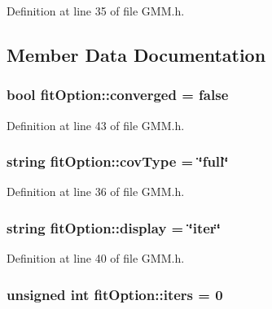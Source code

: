 Definition at line 35 of file G\+M\+M.\+h.



\subsection{Member Data Documentation}
\hypertarget{structfit_option_a600d82e88e845abb5a442f80eecf89cb}{
\subsubsection[{converged}]{\setlength{\rightskip}{0pt plus 5cm}bool fit\+Option\+::converged = false}}\label{structfit_option_a600d82e88e845abb5a442f80eecf89cb}


Definition at line 43 of file G\+M\+M.\+h.

\hypertarget{structfit_option_ae1d880f6fcd26e15f07d50c77c5cceea}{
\subsubsection[{cov\+Type}]{\setlength{\rightskip}{0pt plus 5cm}string fit\+Option\+::cov\+Type = \char`\"{}full\char`\"{}}}\label{structfit_option_ae1d880f6fcd26e15f07d50c77c5cceea}


Definition at line 36 of file G\+M\+M.\+h.

\hypertarget{structfit_option_acd949efbbb51ddf447d4cb86fd2ac901}{
\subsubsection[{display}]{\setlength{\rightskip}{0pt plus 5cm}string fit\+Option\+::display = \char`\"{}iter\char`\"{}}}\label{structfit_option_acd949efbbb51ddf447d4cb86fd2ac901}


Definition at line 40 of file G\+M\+M.\+h.

\hypertarget{structfit_option_a711048d488fccee5740b31e4149c46de}{
\subsubsection[{iters}]{\setlength{\rightskip}{0pt plus 5cm}unsigned int fit\+Option\+::iters = 0}}\label{structfit_option_a711048d488fccee5740b31e4149c46de}


